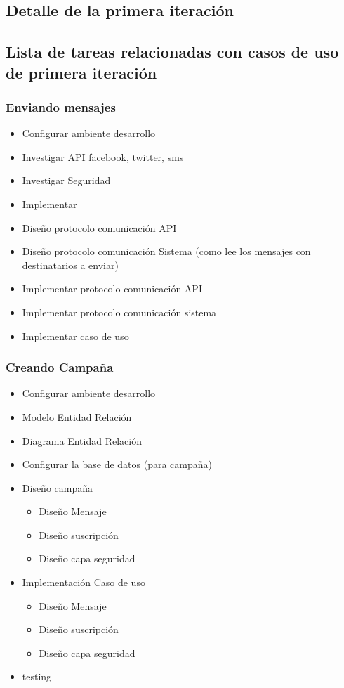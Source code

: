 \documentclass[a4paper, 11pt]{article}
\begin{document}




\subsection{Detalle de la primera iteraci\'on}


\subsection{Lista de tareas relacionadas con casos de uso de primera iteraci\'on}
\subsubsection{Enviando mensajes}
\begin{itemize}
\item Configurar ambiente desarrollo
\item Investigar API facebook, twitter, sms
\item Investigar Seguridad
\item Implementar 
\item Dise\~no protocolo comunicaci\'on API 
\item Dise\~no protocolo comunicaci\'on Sistema  (como lee los mensajes con destinatarios a enviar)
\item Implementar protocolo comunicaci\'on API
\item Implementar protocolo comunicaci\'on sistema
\item Implementar caso de uso
\end{itemize}

\subsubsection{Creando Campa\~na}
\begin{itemize}
\item Configurar ambiente desarrollo
\item Modelo Entidad Relaci\'on
\item Diagrama Entidad Relaci\'on
\item Configurar la base de datos (para campa\~na)
\item Dise\~no campa\~na
\begin{itemize}
\item Dise\~no Mensaje
\item Dise\~no suscripci\'on
\item Dise\~no capa seguridad
\end{itemize}
\item Implementaci\'on Caso de uso
\begin{itemize}
\item Dise\~no Mensaje
\item Dise\~no suscripci\'on
\item Dise\~no capa seguridad
\end{itemize}
\item testing
\end{itemize}
\end{document}
